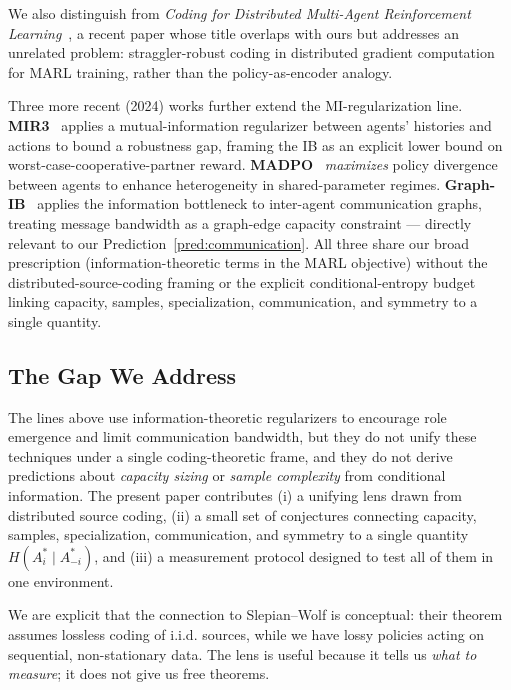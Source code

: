 \documentclass[10pt, letterpaper]{article}
\begin{document}
We also distinguish from \emph{Coding for Distributed Multi-Agent Reinforcement Learning}~\cite{wang2021coding}, a recent paper whose title overlaps with ours but addresses an unrelated problem: straggler-robust coding in distributed gradient computation for MARL training, rather than the policy-as-encoder analogy.

Three more recent (2024) works further extend the MI-regularization line. \textbf{MIR3}~\cite{liu2024mir3} applies a mutual-information regularizer between agents' histories and actions to bound a robustness gap, framing the IB as an explicit lower bound on worst-case-cooperative-partner reward. \textbf{MADPO}~\cite{madpo2024} \emph{maximizes} policy divergence between agents to enhance heterogeneity in shared-parameter regimes. \textbf{Graph-IB}~\cite{ding2024graphib} applies the information bottleneck to inter-agent communication graphs, treating message bandwidth as a graph-edge capacity constraint --- directly relevant to our Prediction~\ref{pred:communication}. All three share our broad prescription (information-theoretic terms in the MARL objective) without the distributed-source-coding framing or the explicit conditional-entropy budget linking capacity, samples, specialization, communication, and symmetry to a single quantity.

\subsection{The Gap We Address}

The lines above use information-theoretic regularizers to encourage role emergence and limit communication bandwidth, but they do not unify these techniques under a single coding-theoretic frame, and they do not derive predictions about \emph{capacity sizing} or \emph{sample complexity} from conditional information. The present paper contributes (i) a unifying lens drawn from distributed source coding, (ii) a small set of conjectures connecting capacity, samples, specialization, communication, and symmetry to a single quantity $H(A_i^* \mid A_{-i}^*)$, and (iii) a measurement protocol designed to test all of them in one environment.

We are explicit that the connection to Slepian--Wolf is conceptual: their theorem assumes lossless coding of i.i.d. sources, while we have lossy policies acting on sequential, non-stationary data. The lens is useful because it tells us \emph{what to measure}; it does not give us free theorems.

\end{document}
